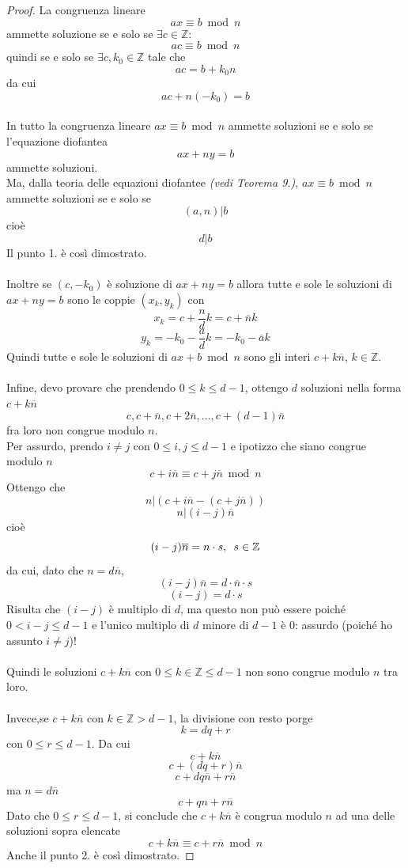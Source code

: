 \documentclass[a4paper,12pt, oneside]{book}
\begin{document}
\begin{teorema}
	\begin{proof}
		La congruenza lineare
		$$ax \equiv b \bmod n$$
		ammette soluzione se e solo se $\exists c \in \mathbb{Z}$:
		$$ac \equiv b \bmod n$$
		quindi se e solo se $\exists c, k_0 \in \mathbb{Z}$ tale che
		$$ac = b +k_0 n$$
		da cui
		$$ac + n(-k_0) = b$$\\
		In tutto  la congruenza lineare $ax \equiv b \bmod n$ ammette soluzioni se e solo se l'equazione diofantea
		$$ax+ny=b$$
		ammette soluzioni.\\
		Ma, dalla teoria delle equazioni diofantee \textit{(vedi Teorema 9.)}, $ax \equiv b \bmod n$ ammette soluzioni se e solo se
		$$(a,n)|b$$ cioè $$d|b$$
		Il punto 1. è così dimostrato.\\\\
		Inoltre se $(c, -k_0)$ è soluzione di $ax+ny=b$ allora tutte e sole le soluzioni di $ax+ny=b$ sono le coppie $(x_k,y_k)$ con
		$$x_k=c+\frac{n}{d}k = c+\overline{n}k$$
		$$y_k=-k_0-\frac{a}{d}k = -k_0-\overline{a}k$$
		Quindi tutte e sole le soluzioni di $ax+b \bmod n$ sono gli interi $c+k\overline{n}$, $k \in \mathbb{Z}$.\\\\
		Infine, devo provare che prendendo $0 \leq k \leq d-1$, ottengo $d$ soluzioni nella forma $c+k\overline{n}$
		$$c, c+\overline{n}, c+2\overline{n}, \dots, c+(d-1)\overline{n}$$
		fra loro non congrue modulo $n$.\\
		Per assurdo, prendo $i \not = j$ con $0 \leq i,j \leq d-1$
		e ipotizzo che siano congrue modulo $n$
		$$c+i\overline{n} \equiv c+j\overline{n} \bmod n$$
		Ottengo che
		$$n | (c+i\overline{n} - (c+ j\overline{n}))$$
		$$n | (i-j)\overline{n}$$
		cioè
		$$(i-j)\overline{n} = n \cdot s \mbox{,\space\space }s \in \mathbb{Z}$$
		da cui, dato che $n = d\overline{n}$,
		$$(i-j)\overline{n} = d \cdot \overline{n} \cdot s$$
		$$(i-j) = d \cdot s$$
		Risulta che $(i-j)$ è multiplo di $d$, ma questo non può essere poiché $0 < i-j \leq d-1$ e l'unico multiplo di $d$ minore di $d-1$ è $0$: assurdo (poiché ho assunto $i \not = j$)!\\\\
		Quindi le soluzioni $c+k\overline{n}$ con $0 \leq k \in \mathbb{Z} \leq d-1$ non sono congrue modulo $n$ tra loro.\\\\
		Invece,se $c+k\overline{n}$ con $k \in \mathbb{Z} > d-1$, la divisione con resto porge
		$$k=dq+r$$ con $0 \leq r \leq d-1$. Da cui
		$$c+k\overline{n}$$
		$$c+(dq+r)\overline{n}$$
		$$c+dq\overline{n}+r\overline{n}$$
		ma $n = d\overline{n}$
		$$c+qn+r\overline{n}$$
		Dato che $0 \leq r \leq d-1$, si conclude che $c+k\overline{n}$ è congrua modulo $n$ ad una delle soluzioni sopra elencate $$c+k\overline{n} \equiv c+r\overline{n} \bmod n$$
		Anche il punto 2. è così dimostrato.

	\end{proof}
\end{teorema}
\end{document}
